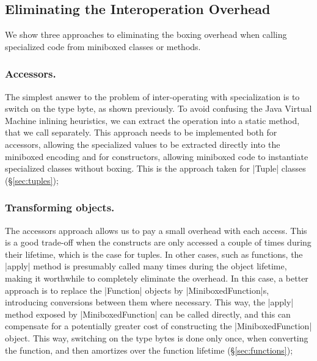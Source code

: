 \subsection{Eliminating the Interoperation Overhead}

\vspace{-0.25em}

We show three approaches to eliminating the boxing overhead when calling specialized code from miniboxed classes or methods.

\vspace{-0.5em}

\subsubsection{Accessors.} The simplest answer to the problem of inter-operating with specialization is to switch on the type byte, as shown previously. To avoid confusing the Java Virtual Machine inlining heuristics, we can extract the operation into a static method, that we call separately. This approach needs to be implemented both for accessors, allowing the specialized values to be extracted directly into the miniboxed encoding and for constructors, allowing miniboxed code to instantiate specialized classes without boxing. This is the approach taken for |Tuple| classes (\S\ref{sec:tuples});

\vspace{-0.5em}

\subsubsection{Transforming objects.} The accessors approach allows us to pay a small overhead with each access. This is a good trade-off when the constructs are only accessed a couple of times during their lifetime, which is the case for tuples. In other cases, such as functions, the |apply| method is presumably called many times during the object lifetime, making it worthwhile to completely eliminate the overhead. In this case, a better approach is to replace the |Function| objects by |MiniboxedFunction|s, introducing conversions between them where necessary. This way, the |apply| method exposed by |MiniboxedFunction| can be called directly, and this can compensate for a potentially greater cost of constructing the |MiniboxedFunction| object. This way, switching on the type bytes is done only once, when converting the function, and then amortizes over the function lifetime (\S\ref{sec:functions});

